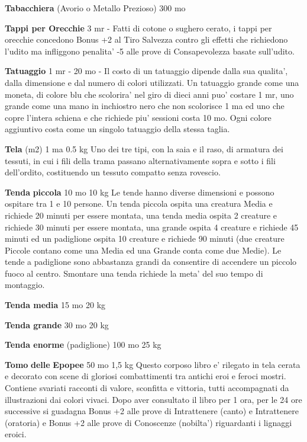\documentclass[a4paper,11pt,twoside,openany]{dndbook}
\begin{document}
{\textbf{Tabacchiera} (Avorio o Metallo Prezioso) 300 mo

\textbf{Tappi per Orecchie} 3 mr - Fatti di cotone o sughero cerato, i tappi per orecchie concedono Bonus +2 al Tiro Salvezza contro gli effetti che richiedono l'udito ma infliggono penalita' -5 alle prove di Consapevolezza basate sull'udito.

\textbf{Tatuaggio} 1 mr - 20 mo - Il costo di un tatuaggio dipende dalla sua qualita', dalla dimensione e dal numero di colori utilizzati. Un tatuaggio grande come una moneta, di colore blu che scolorira' nel giro di dieci anni puo' costare 1 mr, uno grande come una mano in inchiostro nero che non scolorisce 1 ma ed uno che copre l'intera schiena e che richiede piu' sessioni costa 10 mo. Ogni colore aggiuntivo costa come un singolo tatuaggio della stessa taglia.

\textbf{Tela} (m2) 1 ma 0.5 kg Uno dei tre tipi, con la saia e il raso, di armatura dei tessuti, in cui i fili della trama passano alternativamente sopra e sotto i fili dell'ordito, costituendo un tessuto compatto senza rovescio.

\textbf{Tenda} \textbf{piccola} 10 mo 10 kg Le tende hanno diverse dimensioni e possono ospitare tra 1 e 10 persone. Un tenda piccola ospita una creatura Media e richiede 20 minuti per essere montata, una tenda media ospita 2 creature e richiede 30 minuti per essere montata, una grande ospita 4 creature e richiede 45 minuti ed un padiglione ospita 10 creature e richiede 90 minuti (due creature Piccole contano come una Media ed una Grande conta come due Medie). Le tende a padiglione sono abbastanza grandi da consentire di accendere un piccolo fuoco al centro. Smontare una tenda richiede la meta' del suo tempo di montaggio.

\textbf{Tenda media} 15 mo 20 kg

\textbf{Tenda grande} 30 mo 20 kg

\textbf{Tenda enorme} (padiglione) 100 mo 25 kg

\textbf{Tomo} \textbf{delle} \textbf{Epopee} 50 mo 1,5 kg Questo corposo libro e' rilegato in tela cerata e decorato con scene di gloriosi combattimenti tra antichi eroi e feroci mostri. Contiene svariati racconti di valore, sconfitta e vittoria, tutti accompagnati da illustrazioni dai colori vivaci. Dopo aver consultato il libro per 1 ora, per le 24 ore successive si guadagna Bonus +2 alle prove di Intrattenere (canto) e Intrattenere (oratoria) e Bonus +2 alle prove di Conoscenze (nobilta') riguardanti i lignaggi eroici.

}
\end{document}
